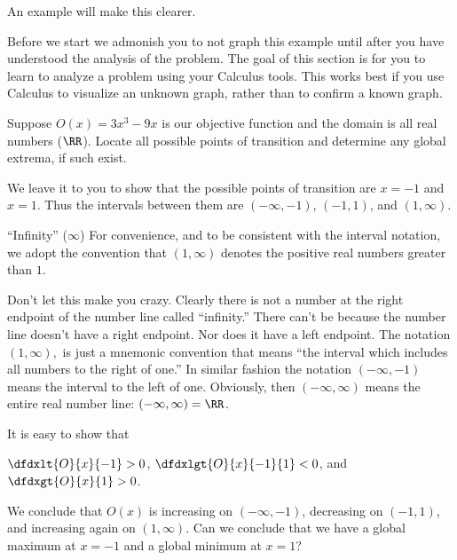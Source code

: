 An example will make this clearer.
\begin{myexample}
  Before we start we admonish you to \alert{not} graph this
  example until after you have understood the analysis of the
  problem. The goal of this section is for you to learn to analyze a
  problem using your Calculus tools. This works best if you use
  Calculus to visualize an unknown graph, rather than to confirm a
  known graph.

    Suppose $O(x)=3x^3-9x$ is our objective
    function and the domain is all real numbers ($\RR$). Locate all
    possible points of transition and determine any global extrema, if
    such exist.

    We leave it to you to show that the possible points of transition
    are $x=-1$ and $x=1$. Thus the intervals between them are
    $(-\infty,-1)$, $(-1,1)$, and
    $( 1,\infty)$.
    \begin{center}
      \begin{minipage}{.75\linewidth}
        \begin{mynotation}{``Infinity'' ($\infty$)} For convenience,
          and to be consistent with the interval notation, we adopt
          the convention that $(1,\infty)$ denotes the positive real
          numbers greater than $1$.

          Don't let this make you crazy.  Clearly there is not a
          number at the right endpoint of the number line called
          ``infinity.''  There can't be because the number line
          doesn't have a right endpoint. Nor does it have a left
          endpoint. The notation $(1,\infty),$ is just a mnemonic
          convention that means ``the interval which includes all
          numbers to the right of one.'' In similar fashion the
          notation $(-\infty,-1)$ means the interval to the left of
          one. Obviously, then $(-\infty,\infty)$ means the entire
          real number line: $(-\infty, \infty)= \RR$.
        \end{mynotation}
      \end{minipage}
    \end{center}
    It is easy to show that\\
    \centerline{\hfill{}$\dfdxlt{O}{x}{-1}>0$,\hfill{}
      $\dfdxlgt{O}{x}{-1}{1}<0$, \hfill{}and
      \hfill{}$\dfdxgt{O}{x}{1}>0$.\hfill}

    We conclude that $O(x)$ is increasing on $(-\infty,-1)$,
    decreasing on $(-1,1)$, and increasing again on $(1,\infty)$.  Can
    we conclude that we have a global maximum at $x=-1$ and a global
    minimum at $x=1$?


\end{myexample}
